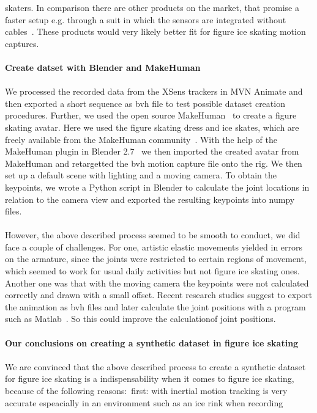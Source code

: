 skaters.
In comparison there are other products on the market, that promise a faster setup e.g. through a suit in which the
sensors
are integrated without cables~\cite{mocapinterialneuron}. These products would very likely better fit for figure ice
skating
motion captures.
\\\mbox{}\\
\textbf{Create datset with Blender and MakeHuman}\\\mbox{}\\
We processed the recorded data from the XSens trackers in MVN Animate and then exported a short sequence as bvh file
to test possible dataset creation procedures.
Further, we used the open source MakeHuman~\cite{makehuman} to create a figure skating avatar.
Here we used the figure skating dress and ice skates, which are freely available from the MakeHuman
community~\cite{makehumanassets}.
With the help of the MakeHuman plugin in Blender 2.7~\cite{blender} we then imported the created avatar from MakeHuman
and retargetted the bvh motion capture file onto the rig.
We then set up a default scene with lighting and a moving camera.
To obtain the keypoints, we wrote a Python script in Blender to calculate the joint locations in relation to the camera
view and exported the resulting keypoints into numpy files.
\\\mbox{}\\
However, the above described process seemed to be smooth to conduct, we did face a couple of challenges.
For one, artistic elastic movements yielded in errors on the armature, since the joints were restricted to certain
regions of movement, which seemed to work for usual daily activities but not figure ice skating ones.
Another one was that with the moving camera the keypoints were not calculated correctly and drawn with a small offset.
Recent research studies suggest to export the animation as bvh files and later calculate the joint positions with a
program such as Matlab~\cite{synpose300, 3dpeople, gaitblender}. So this could improve the calculationof joint
positions.
\\\mbox{}\\
\textbf{Our conclusions on creating a synthetic dataset in figure ice skating}\\\mbox{}\\
We are convinced that the above described process to create a synthetic dataset for figure ice skating is a
indispensability when it comes to figure ice skating,
because of the following reasons:\
first: with inertial motion tracking is very accurate espeacially in an environment such as an ice rink when recording
